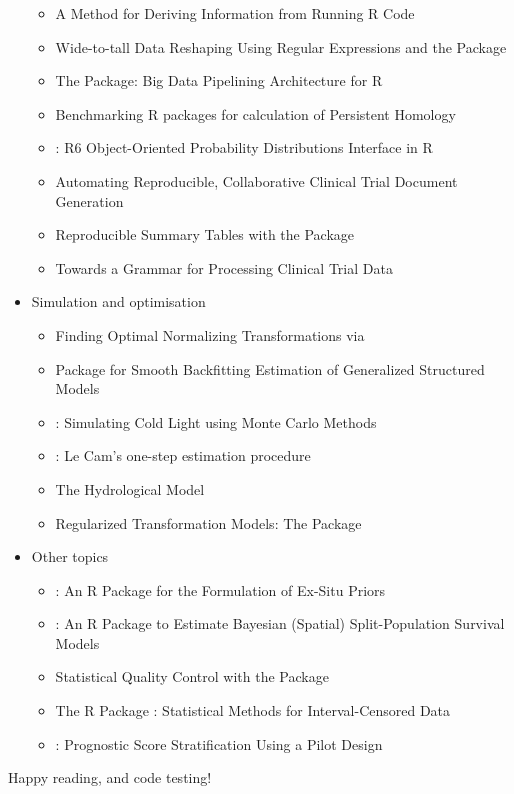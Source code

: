 \begin{itemize}
  \begin{itemize}
  \tightlist
  \item
    A Method for Deriving Information from Running R Code
  \item
    Wide-to-tall Data Reshaping Using Regular Expressions and the  Package
  \item
    The  Package: Big Data Pipelining Architecture for R
  \item
    Benchmarking R packages for calculation of Persistent Homology
  \item
    : R6 Object-Oriented Probability Distributions Interface in R
  \item
    Automating Reproducible, Collaborative Clinical Trial Document Generation
  \item
    Reproducible Summary Tables with the  Package
  \item
    Towards a Grammar for Processing Clinical Trial Data
  \end{itemize}
\item
  Simulation and optimisation

  \begin{itemize}
  \tightlist
  \item
    Finding Optimal Normalizing Transformations via 
  \item
    Package  for Smooth Backfitting Estimation of Generalized Structured
    Models
  \item
    : Simulating Cold Light using Monte Carlo Methods
  \item
    : Le Cam's one-step estimation procedure
  \item
    The  Hydrological Model
  \item
    Regularized Transformation Models: The  Package
  \end{itemize}
\item
  Other topics

  \begin{itemize}
  \tightlist
  \item
    : An R Package for the Formulation of Ex-Situ Priors
  \item
    : An R Package to Estimate Bayesian (Spatial) Split-Population Survival Models
  \item
    Statistical Quality Control with the  Package
  \item
    The R Package : Statistical Methods for Interval-Censored Data
  \item
    : Prognostic Score Stratification Using a Pilot Design
  \end{itemize}
\end{itemize}

Happy reading, and code testing!


\address{%
Dianne Cook\\
Monash University\\%
\\
%
\url{https://journal.r-project.org}\\%
%
\href{mailto:r-journal@r-project.org}{\nolinkurl{r-journal@r-project.org}}%
}
